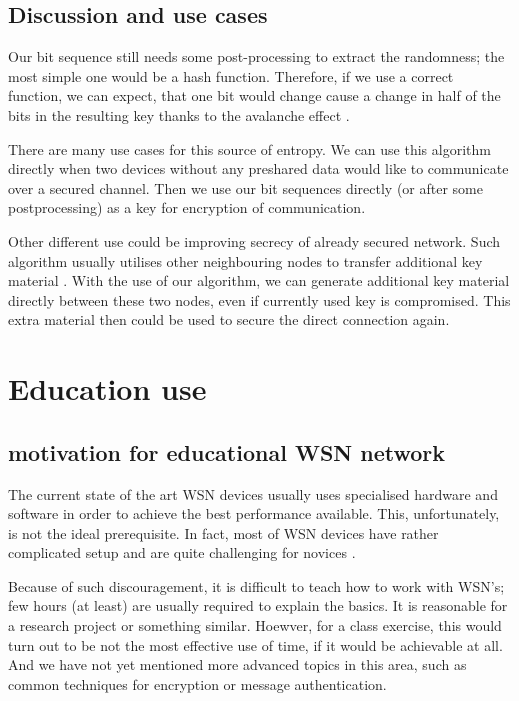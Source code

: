 \documentclass[
  print, %
  Table,   %
  nolof,     %
  nolot,     %
           oneside
]{fithesis3}
\begin{document}
  \section{Discussion and use cases}\label{sec:use}
  Our bit sequence still needs some post-processing to extract the randomness; the most simple one would be a hash function. Therefore, if we use a correct function, we can expect, that one bit would change cause a change in half of the bits in the resulting key thanks to the avalanche effect \cite{Webster1986}.

  There are many use cases for this source of entropy. We can use this algorithm directly when two devices without any preshared data would like to communicate over a secured channel. Then we use our bit sequences directly (or after some postprocessing) as a key for encryption of communication.

  Other different use could be improving secrecy of already secured network. Such algorithm usually utilises other neighbouring nodes to transfer additional key material \cite{2015-wistp-ostadal}. With the use of our algorithm, we can generate additional key material directly between these two nodes, even if currently used key is compromised. This extra material then could be used to secure the direct connection again.


\chapter{Education use}\label{ch:edu}

  \section{motivation for educational WSN network}
  The current state of the art WSN devices usually uses specialised hardware and software in order to achieve the best performance available. %
  This, unfortunately, is not the ideal prerequisite. In fact, most of WSN devices have rather complicated setup and are quite challenging for novices \cite{hu2010wireless}.

  Because of such discouragement, it is difficult to teach how to
  work with WSN’s; few hours (at least) are usually required
  to explain the basics. It is reasonable for a research project or
  something similar. Hoewver, for a class exercise, this would turn out to be
  not the most effective use of time, if it would be achievable at all. And
  we have not yet mentioned more advanced topics in this area, such as
  common techniques for encryption or message authentication.
\end{document}
